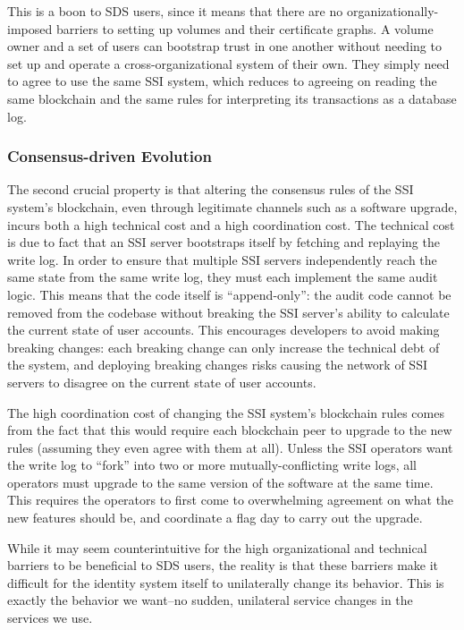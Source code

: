 This is a boon to SDS users, since it means
that there are no organizationally-imposed barriers to setting up volumes and
their certificate graphs.  A volume owner and a set of users can bootstrap trust
in one another without needing to set up and operate a cross-organizational
system of their own.  They simply need to agree to use the same SSI system,
which reduces to agreeing on reading the same blockchain and the same rules for
interpreting its transactions as a database log.

\subsubsection{Consensus-driven Evolution}

The second crucial property is that altering the consensus rules of the SSI system's
blockchain, even through legitimate channels such as a 
software upgrade, incurs both a high technical cost and a high coordination cost.
The technical cost is due to fact that an SSI server
bootstraps itself by fetching and replaying the write log.  In order to
ensure that multiple SSI servers independently reach the same state from the
same write log, they must each implement the same audit logic.  This means that
the code itself is ``append-only'':  the audit code cannot be removed from
the codebase without breaking the SSI server's ability to calculate the current
state of user accounts.  This encourages developers to avoid making breaking
changes: each breaking change can only increase the technical debt of the
system, and deploying breaking changes risks causing the network of SSI servers
to disagree on the current state of user accounts.

The high coordination cost of changing the SSI system's blockchain rules
comes from the fact that this would require each blockchain peer to upgrade
to the new rules (assuming they even agree with them at all).  Unless the SSI
operators want the write log to ``fork'' into two or more mutually-conflicting
write logs, all operators must upgrade to the same version of the software
at the same time.  This requires the operators to first come to overwhelming
agreement on what the new features should be, and coordinate a flag day
to carry out the upgrade.

While it may seem counterintuitive for the high organizational and technical
barriers to be beneficial to SDS users, the reality is that these barriers
make it difficult for the identity system itself to unilaterally change its
behavior.  This is exactly the behavior we want--no sudden,
unilateral service changes in the services we use.

